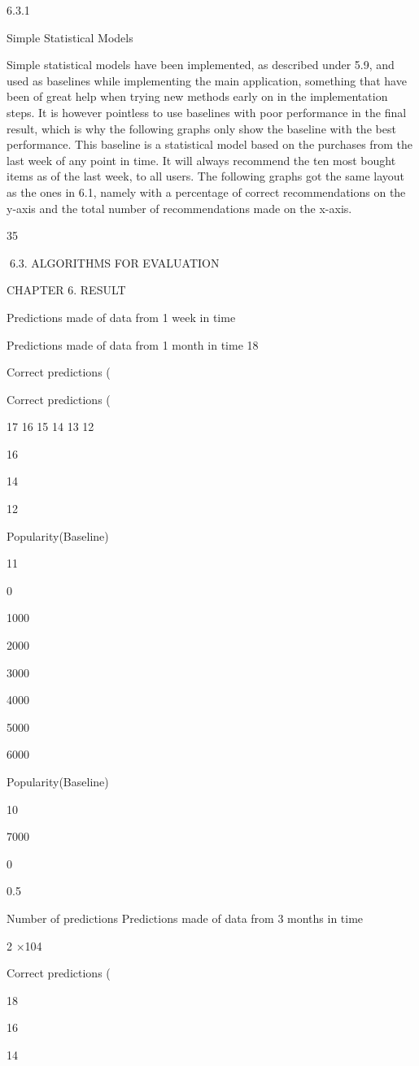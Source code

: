 6.3.1

Simple Statistical Models

Simple statistical models have been implemented, as described under 5.9, and used as
baselines while implementing the main application, something that have been of great
help when trying new methods early on in the implementation steps. It is however
pointless to use baselines with poor performance in the final result, which is why the
following graphs only show the baseline with the best performance. This baseline is a
statistical model based on the purchases from the last week of any point in time. It
will always recommend the ten most bought items as of the last week, to all users. The
following graphs got the same layout as the ones in 6.1, namely with a percentage of
correct recommendations on the y-axis and the total number of recommendations made
on the x-axis.

35

6.3. ALGORITHMS FOR EVALUATION

CHAPTER 6. RESULT

Predictions made of data from 1 week in time

Predictions made of data from 1 month in time
18

Correct predictions (%

Correct predictions (%

17
16
15
14
13
12

16

14

12

Popularity(Baseline)

11

0

1000

2000

3000

4000

5000

6000

Popularity(Baseline)

10

7000

0

0.5

Number of predictions
Predictions made of data from 3 months in time

2
×104

Correct predictions (%

18

16

14

